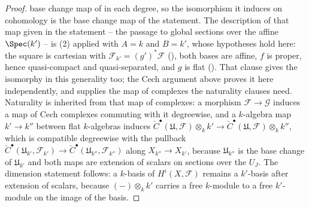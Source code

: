 \begin{proof}
base change map of  in each degree, so the
isomorphism it induces on cohomology is the base change map of the
statement.  The description of that map given in the statement -- the
passage to global sections over the affine \(\Spec(k')\) -- is
(2) applied with \(A=k\) and
\(B=k'\), whose hypotheses hold here: the square is cartesian with
\(\mathcal F_{k'}=(g')^*\mathcal F\) (), both
bases are affine, \(f\) is proper, hence quasi-compact and
quasi-separated, and \(g\) is flat ().  That
clause gives the isomorphy in this generality too; the Cech argument
above proves it here independently, and supplies the map of complexes
the naturality clauses need.
Naturality is inherited from that map of complexes: a
morphism \(\mathcal F\to\mathcal G\) induces a map of Cech complexes
commuting with it degreewise, and a \(k\)-algebra map \(k'\to k''\)
between flat \(k\)-algebras induces
\(\check C^\bullet(\mathfrak U,\mathcal F)\otimes_kk'\to
\check C^\bullet(\mathfrak U,\mathcal F)\otimes_kk''\), which is
compatible degreewise with the pullback
\(\check C^\bullet(\mathfrak U_{k'},\mathcal F_{k'})\to
\check C^\bullet(\mathfrak U_{k''},\mathcal F_{k''})\) along
\(X_{k''}\to X_{k'}\), because \(\mathfrak U_{k''}\) is the base change
of \(\mathfrak U_{k'}\) and both maps are extension of scalars on
sections over the \(U_J\).
The dimension statement follows: a \(k\)-basis of
\(H^i(X,\mathcal F)\) remains a \(k'\)-basis after extension of
scalars, because \((-)\otimes_kk'\) carries a free \(k\)-module to a
free \(k'\)-module on the image of the basis.
\end{proof}

